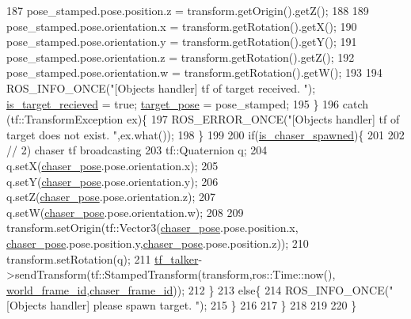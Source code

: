 \begin{DoxyCode}
187             pose\_stamped.pose.position.z = transform.getOrigin().getZ();
188 
189             pose\_stamped.pose.orientation.x = transform.getRotation().getX();
190             pose\_stamped.pose.orientation.y = transform.getRotation().getY();
191             pose\_stamped.pose.orientation.z = transform.getRotation().getZ();
192             pose\_stamped.pose.orientation.w = transform.getRotation().getW();        
193 
194             ROS\_INFO\_ONCE(\textcolor{stringliteral}{"[Objects handler] tf of target received. "}); 
      \hyperlink{class_objects_handler_a7691f3e1ec58e55ead30c50c555f169a}{is\_target\_recieved} = \textcolor{keyword}{true}; \hyperlink{class_objects_handler_ad436bfd8b262f473f0e4ca92b3c3402b}{target\_pose} = pose\_stamped;
195         \}
196         \textcolor{keywordflow}{catch} (tf::TransformException ex)\{
197             ROS\_ERROR\_ONCE(\textcolor{stringliteral}{"[Objects handler] tf of target does not exist. "},ex.what());  
198         \}    
199             
200         \textcolor{keywordflow}{if}(\hyperlink{class_objects_handler_a16165ae7c0167ba8d2a0151a8a4fbfd5}{is\_chaser\_spawned})\{
201 
202             \textcolor{comment}{// 2) chaser tf broadcasting}
203             tf::Quaternion q;
204             q.setX(\hyperlink{class_objects_handler_a79fd5f872a40cca5ea599f1e83dcb3ad}{chaser\_pose}.pose.orientation.x);
205             q.setY(\hyperlink{class_objects_handler_a79fd5f872a40cca5ea599f1e83dcb3ad}{chaser\_pose}.pose.orientation.y);
206             q.setZ(\hyperlink{class_objects_handler_a79fd5f872a40cca5ea599f1e83dcb3ad}{chaser\_pose}.pose.orientation.z);
207             q.setW(\hyperlink{class_objects_handler_a79fd5f872a40cca5ea599f1e83dcb3ad}{chaser\_pose}.pose.orientation.w);
208             
209             transform.setOrigin(tf::Vector3(\hyperlink{class_objects_handler_a79fd5f872a40cca5ea599f1e83dcb3ad}{chaser\_pose}.pose.position.x,
      \hyperlink{class_objects_handler_a79fd5f872a40cca5ea599f1e83dcb3ad}{chaser\_pose}.pose.position.y,\hyperlink{class_objects_handler_a79fd5f872a40cca5ea599f1e83dcb3ad}{chaser\_pose}.pose.position.z));
210             transform.setRotation(q);
211             \hyperlink{class_objects_handler_af49de4eabb124e2ee6c9e12ebb31bca3}{tf\_talker}->sendTransform(tf::StampedTransform(transform,ros::Time::now(),
      \hyperlink{class_objects_handler_a1c0586ae7467bb8a3df8ad247ac7b10b}{world\_frame\_id},\hyperlink{class_objects_handler_a3e8d08bf5d76d69f1768b53fd799953c}{chaser\_frame\_id}));        
212         \}
213         \textcolor{keywordflow}{else}\{
214             ROS\_INFO\_ONCE(\textcolor{stringliteral}{"[Objects handler] please spawn target. "});  
215         \}
216      
217     \}   
218 
219 
220 \}
\end{DoxyCode}


